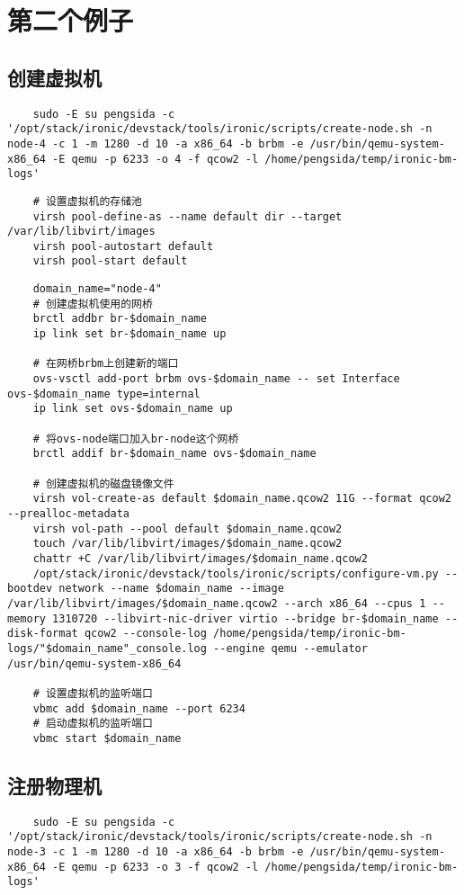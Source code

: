 \documentclass[a4paper,left=2.5cm,right=2.5cm,11pt]{article}
\begin{document}
\section{第二个例子}
\subsection{创建虚拟机}

	\begin{lstlisting}
	sudo -E su pengsida -c '/opt/stack/ironic/devstack/tools/ironic/scripts/create-node.sh -n node-4 -c 1 -m 1280 -d 10 -a x86_64 -b brbm -e /usr/bin/qemu-system-x86_64 -E qemu -p 6233 -o 4 -f qcow2 -l /home/pengsida/temp/ironic-bm-logs'
	\end{lstlisting}

	\begin{lstlisting}
	# 设置虚拟机的存储池
	virsh pool-define-as --name default dir --target /var/lib/libvirt/images
	virsh pool-autostart default
	virsh pool-start default
	\end{lstlisting}

	\begin{lstlisting}
	domain_name="node-4"
	# 创建虚拟机使用的网桥
	brctl addbr br-$domain_name
	ip link set br-$domain_name up

	# 在网桥brbm上创建新的端口
	ovs-vsctl add-port brbm ovs-$domain_name -- set Interface ovs-$domain_name type=internal
	ip link set ovs-$domain_name up

	# 将ovs-node端口加入br-node这个网桥
	brctl addif br-$domain_name ovs-$domain_name

	# 创建虚拟机的磁盘镜像文件
	virsh vol-create-as default $domain_name.qcow2 11G --format qcow2 --prealloc-metadata
	virsh vol-path --pool default $domain_name.qcow2
	touch /var/lib/libvirt/images/$domain_name.qcow2
	chattr +C /var/lib/libvirt/images/$domain_name.qcow2
	/opt/stack/ironic/devstack/tools/ironic/scripts/configure-vm.py --bootdev network --name $domain_name --image /var/lib/libvirt/images/$domain_name.qcow2 --arch x86_64 --cpus 1 --memory 1310720 --libvirt-nic-driver virtio --bridge br-$domain_name --disk-format qcow2 --console-log /home/pengsida/temp/ironic-bm-logs/"$domain_name"_console.log --engine qemu --emulator /usr/bin/qemu-system-x86_64
	
	# 设置虚拟机的监听端口
	vbmc add $domain_name --port 6234
	# 启动虚拟机的监听端口
	vbmc start $domain_name
	\end{lstlisting}
	
\subsection{注册物理机}
	\begin{lstlisting}
	sudo -E su pengsida -c '/opt/stack/ironic/devstack/tools/ironic/scripts/create-node.sh -n node-3 -c 1 -m 1280 -d 10 -a x86_64 -b brbm -e /usr/bin/qemu-system-x86_64 -E qemu -p 6233 -o 3 -f qcow2 -l /home/pengsida/temp/ironic-bm-logs'
	\end{lstlisting}
\end{document}
